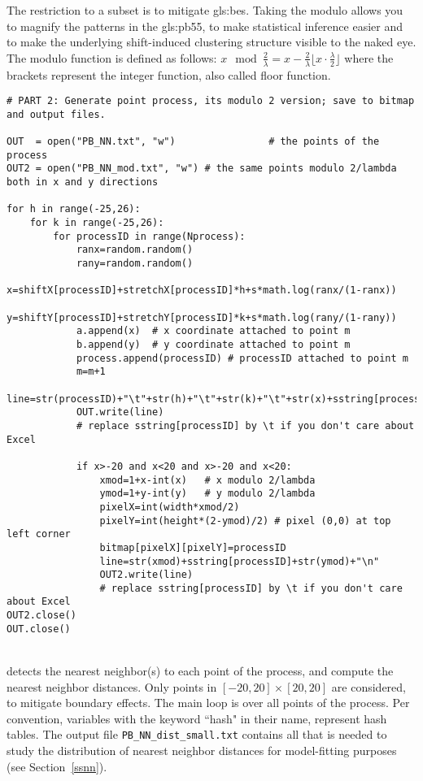 \documentclass[10pt]{article}
\begin{document}
The restriction to a subset is to mitigate 
\glspl{gls:be}. Taking the modulo allows you to magnify the patterns in the 
\gls{gls:pb55}, to make
statistical inference easier and to make the underlying shift-induced clustering structure visible to the naked eye.  The modulo function is defined as follows: 
$x \mod \frac{2}{\lambda} = x - \frac{2}{\lambda}\lfloor x \cdot \frac{\lambda}{2}\rfloor$ 
where the brackets represent the integer function, also called floor function.

\begin{lstlisting}
# PART 2: Generate point process, its modulo 2 version; save to bitmap and output files.

OUT  = open("PB_NN.txt", "w")                # the points of the process 
OUT2 = open("PB_NN_mod.txt", "w") # the same points modulo 2/lambda both in x and y directions

for h in range(-25,26):   
    for k in range(-25,26):  
        for processID in range(Nprocess): 
            ranx=random.random()
            rany=random.random()
            x=shiftX[processID]+stretchX[processID]*h+s*math.log(ranx/(1-ranx)) 
            y=shiftY[processID]+stretchY[processID]*k+s*math.log(rany/(1-rany))
            a.append(x)  # x coordinate attached to point m
            b.append(y)  # y coordinate attached to point m
            process.append(processID) # processID attached to point m
            m=m+1
            line=str(processID)+"\t"+str(h)+"\t"+str(k)+"\t"+str(x)+sstring[processID]+str(y)+"\n"
            OUT.write(line)
            # replace sstring[processID] by \t if you don't care about Excel

            if x>-20 and x<20 and x>-20 and x<20:
                xmod=1+x-int(x)   # x modulo 2/lambda
                ymod=1+y-int(y)   # y modulo 2/lambda
                pixelX=int(width*xmod/2)   
                pixelY=int(height*(2-ymod)/2) # pixel (0,0) at top left corner
                bitmap[pixelX][pixelY]=processID
                line=str(xmod)+sstring[processID]+str(ymod)+"\n"
                OUT2.write(line)  
                # replace sstring[processID] by \t if you don't care about Excel
OUT2.close()
OUT.close()
\end{lstlisting}
\quad \\
 detects the \textcolor{index}{nearest neighbor(s)} to each point of the
process, and compute the \textcolor{index}{nearest neighbor distances}. Only points in $[-20,20]\times[20,20]$ are considered, to mitigate boundary effects. The main loop is over all points of the process. Per convention, variables with the keyword ``hash" in their name, represent
\textcolor{index}{hash tables}. The output file \texttt{PB\_NN\_dist\_small.txt} contains all that is needed to study the distribution of nearest neighbor distances for model-fitting purposes
(see Section~\ref{ssnn}). 
\end{document}
